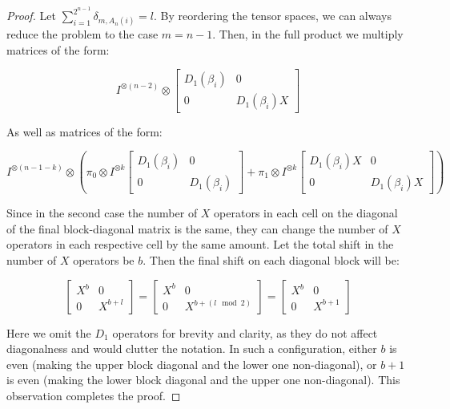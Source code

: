 \documentclass[a4paper, openany, 12pt]{article}
\theoremstyle{remark}
\theoremstyle{definition}
\newcommand{\ot}{\otimes}
\begin{document}
\begin{proof}
Let $\sum_{i=1}^{2^{n-1}}\delta_{m,A_n(i)} = l$.
By reordering the tensor spaces, we can always reduce the problem to the case $m = n - 1$. Then, in the full product we multiply matrices of the form:

\begin{equation}
    I^{\ot(n-2)}\ot\begin{bmatrix}
        D_1(\beta_i)&0\\0&D_1(\beta_i)X
    \end{bmatrix}
\end{equation}

As well as matrices of the form:

\begin{equation}
    I^{\ot(n-1-k)}\ot\left(\pi_0\ot I^{\ot k}\begin{bmatrix}
        D_1(\beta_i)&0\\0&D_1(\beta_i)
    \end{bmatrix} + \pi_1\ot I^{\ot k}\begin{bmatrix}
        D_1(\beta_i)X&0\\0&D_1(\beta_i)X
    \end{bmatrix}\right)
\end{equation}

Since in the second case the number of $X$ operators in each cell on the diagonal of the final block-diagonal matrix is the same, they can change the number of $X$ operators in each respective cell by the same amount. Let the total shift in the number of $X$ operators be $b$. Then the final shift on each diagonal block will be:

\begin{equation}
    \begin{bmatrix}
        X^{b}&0\\0&X^{b+l}
    \end{bmatrix} = \begin{bmatrix}
        X^{b}&0\\0&X^{b+(l\mod 2)}
    \end{bmatrix} = \begin{bmatrix}
        X^{b}&0\\0&X^{b+1}
    \end{bmatrix}
\end{equation}

Here we omit the $D_1$ operators for brevity and clarity, as they do not affect diagonalness and would clutter the notation.
In such a configuration, either $b$ is even (making the upper block diagonal and the lower one non-diagonal), or $b+1$ is even (making the lower block diagonal and the upper one non-diagonal).
This observation completes the proof.
\end{proof}
\end{document}
